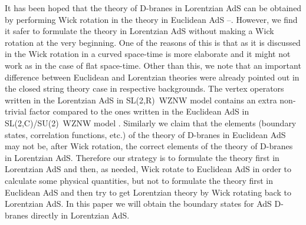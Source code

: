 \documentclass[a4paper,12pt]{article}
\begin{document}
It has been hoped that the theory of D-branes in Lorentzian AdS\coordHE{} can be
obtained by performing Wick rotation in the theory in Euclidean AdS\coordHE{}
\cite{ads2d}--\cite{ponsot}. However, we find it safer to formulate the
theory in Lorentzian AdS\coordHE{} without making a Wick rotation at the very
beginning. One of the reasons of this is that as it is discussed in \cite
{roberts} the Wick rotation in a curved space-time is more elaborate and it
might not work as in the case of flat space-time. Other than this, we note
that an important difference between Euclidean and Lorentzian theories were
already pointed out in the closed string theory case in respective
backgrounds. The vertex operators written in the Lorentzian AdS\coordHE{} in
SL(2,R)\ WZNW model \cite{BDM} contains an extra non-trivial factor compared
to the ones written in the Euclidean AdS\coordHE{} in SL(2,C)/SU(2)\ WZNW model
\cite{teschner-1}. Similarly we claim that the elements (boundary states,
correlation functions, etc.) of the theory of D-branes in Euclidean AdS\coordHE{}
may not be, after Wick rotation, the correct elements of the theory of
D-branes in Lorentzian AdS\coordHE{}. Therefore our strategy is to formulate the
theory first in Lorentzian AdS\coordHE{} and then, as needed, Wick rotate to
Euclidean AdS\coordHE{} in order to calculate some physical quantities, but not
to formulate the theory first in Euclidean AdS\coordHE{} and then try to get
Lorentzian theory by Wick rotating back to Lorentzian AdS\coordHE{}. In this
paper we will obtain the boundary states for AdS\coordHE{} D-branes directly in
Lorentzian AdS\coordHE{}.
\end{document}
